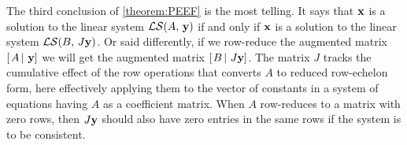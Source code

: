 \documentclass{ximera}
\begin{document}
The third conclusion of \ref{theorem:PEEF} is the most telling.  It
says that $\mathbf{x}$ is a solution to the linear system
$\mathcal{LS}\!\left(A,\,\mathbf{y}\right)$ if and only if $\mathbf{x}$ is a solution
to the linear system $\mathcal{LS}\!\left(B,\,J\mathbf{y}\right)$.  Or said
differently, if we row-reduce the augmented matrix
$\left\lbrack\left.A\,\right\rvert\,\mathbf{y}\right\rbrack$ we will get the augmented matrix
$\left\lbrack\left.B\,\right\rvert\,J\mathbf{y}\right\rbrack$.  The matrix $J$ tracks the cumulative
effect of the row operations that converts $A$ to reduced row-echelon
form, here effectively applying them to the vector of constants in a
system of equations having $A$ as a coefficient matrix.  When $A$
row-reduces to a matrix with zero rows, then $J\mathbf{y}$ should also
have zero entries in the same rows if the system is to be consistent.
\end{document}
